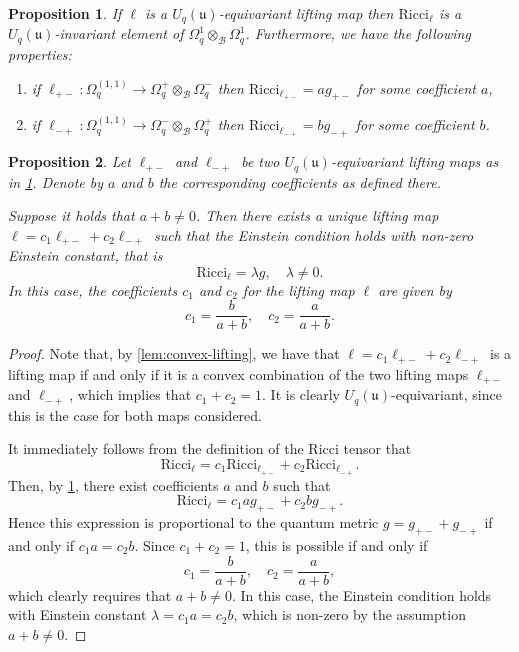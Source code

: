 \documentclass[10pt,a4paper]{amsart}
\newtheorem{proposition}{Proposition}
\newcommand{\Ricci}{\mathrm{Ricci}}
\newcommand{\Uqu}{U_q(\mathfrak{u})}
\newcommand{\diffcalc}{\Omega_q}
\newcommand{\liftmap}{\ell}
\newcommand{\qalg}{\mathcal{B}}
\begin{document}
\begin{proposition}
\label{prop:ricci-proportional}
If $\liftmap$ is a $\Uqu$-equivariant lifting map then $\Ricci_\liftmap$ is a $\Uqu$-invariant element of $\diffcalc^1 \otimes_\qalg \diffcalc^1$. Furthermore, we have the following properties:
\begin{enumerate}
\item if $\liftmap_{+ -} : \diffcalc^{(1, 1)} \to \diffcalc^+ \otimes_\qalg \diffcalc^-$ then $\Ricci_{\liftmap_{+ -}} = a g_{+ -}$ for some coefficient $a$,
\item if $\liftmap_{- +} : \diffcalc^{(1, 1)} \to \diffcalc^- \otimes_\qalg \diffcalc^+$ then $\Ricci_{\liftmap_{- +}} = b g_{- +}$ for some coefficient $b$.
\end{enumerate}
\end{proposition}

\begin{proposition}
\label{prop:einstein-condition}
Let $\liftmap_{+ -}$ and $\liftmap_{- +}$ be two $\Uqu$-equivariant lifting maps as in \cref{prop:ricci-proportional}.
Denote by $a$ and $b$ the corresponding coefficients as defined there.

Suppose it holds that $a + b \neq 0$.
Then there exists a unique lifting map $\liftmap = c_1 \liftmap_{+ -} + c_2 \liftmap_{- +}$ such that the Einstein condition holds with non-zero Einstein constant, that is
\[
\Ricci_\liftmap = \lambda g, \quad \lambda \neq 0.
\]
In this case, the coefficients $c_1$ and $c_2$ for the lifting map $\liftmap$ are given by
\[
c_1 = \frac{b}{a + b}, \quad
c_2 = \frac{a}{a + b}.
\]
\end{proposition}

\begin{proof}
Note that, by \cref{lem:convex-lifting}, we have that $\liftmap = c_1 \liftmap_{+ -} + c_2 \liftmap_{- +}$ is a lifting map if and only if it is a convex combination of the two lifting maps $\liftmap_{+ -}$ and $\liftmap_{- +}$, which implies that $c_1 + c_2 = 1$.
It is clearly $\Uqu$-equivariant, since this is the case for both maps considered.

It immediately follows from the definition of the Ricci tensor that
\[
\Ricci_\ell = c_1 \Ricci_{\ell_{+ -}} + c_2 \Ricci_{\ell_{- +}}.
\]
Then, by \cref{prop:ricci-proportional}, there exist coefficients $a$ and $b$ such that
\[
\Ricci_\ell = c_1 a g_{+ -} + c_2 b g_{- +}.
\]
Hence this expression is proportional to the quantum metric $g = g_{+ -} + g_{- +}$ if and only if $c_1 a = c_2 b$.
Since $c_1 + c_2 = 1$, this is possible if and only if
\[
c_1 = \frac{b}{a + b}, \quad
c_2 = \frac{a}{a + b},
\]
which clearly requires that $a + b \neq 0$.
In this case, the Einstein condition holds with Einstein constant $\lambda = c_1 a = c_2 b$, which is non-zero by the assumption $a + b \neq 0$.
\end{proof}
\end{document}
